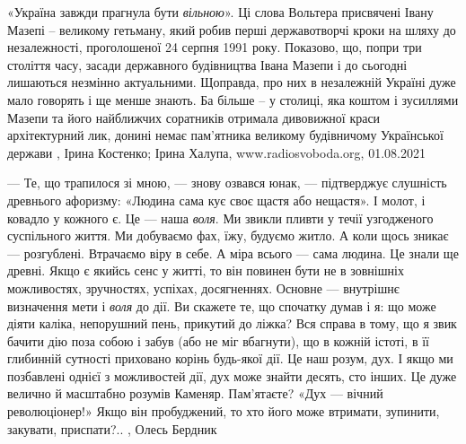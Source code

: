 «Україна завжди прагнула бути \emph{вільною}». Ці слова Вольтера присвячені
Івану Мазепі – великому гетьману, який робив перші державотворчі кроки на шляху
до незалежності, проголошеної 24 серпня 1991 року.  Показово, що, попри три
століття часу, засади державного будівництва Івана Мазепи і до сьогодні
лишаються незмінно актуальними.  Щоправда, про них в незалежній Україні дуже
мало говорять і ще менше знають. Ба більше – у столиці, яка коштом і зусиллями
Мазепи та його найближчих соратників отримала дивовижної краси архітектурний
лик, донині немає пам’ятника великому будівничому Української держави
, 
Ірина Костенко; Ірина Халупа, www.radiosvoboda.org, 01.08.2021

— Те, що трапилося зі мною, — знову озвався юнак, — підтверджує слушність
древнього афоризму: «Людина сама кує своє щастя або нещастя». І молот, і
ковадло у кожного є. Це — наша \emph{воля}. Ми звикли пливти у течії узгодженого
суспільного життя. Ми добуваємо фах, їжу, будуємо житло. А коли щось зникає —
розгублені. Втрачаємо віру в себе. А міра всього — сама людина. Це знали ще
древні. Якщо є якийсь сенс у житті, то він повинен бути не в зовнішніх
можливостях, зручностях, успіхах, досягненнях. Основне — внутрішнє визначення
мети і \emph{воля} до дії. Ви скажете те, що спочатку думав і я: що може діяти каліка,
непорушний пень, прикутий до ліжка? Вся справа в тому, що я звик бачити дію
поза собою і забув (або не міг вбагнути), що в кожній істоті, в її глибинній
сутності приховано корінь будь-якої дії. Це наш розум, дух. І якщо ми
позбавлені однієї з можливостей дії, дух може знайти десять, сто інших. Це дуже
велично й масштабно розумів Каменяр. Пам’ятаєте? «Дух — вічний революціонер!»
Якщо він пробуджений, то хто його може втримати, зупинити, закувати,
приспати?..
, Олесь Бердник
